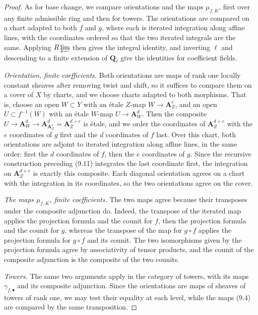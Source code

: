 \documentclass[11pt]{article}
\begin{document}
\begin{proof}[{Proof}]\label{bp82}%
As for base change, we compare orientations and the maps \(\mu_{f,K}\), first over any finite admissible ring and then for towers. The orientations are compared on a chart adapted to both \(f\) and \(g\), where each is iterated integration along affine lines, with the coordinates ordered so that the two iterated integrals are the same. Applying \(R\varprojlim\) then gives the integral identity, and inverting \(\ell\) and descending to a finite extension of \(\mathbf Q_\ell\) give the identities for coefficient fields.

\emph{Orientation, finite coefficients.} Both orientations are maps of rank one locally constant sheaves after removing twist and shift, so it suffices to compare them on a cover of \(X\) by charts, and we choose charts adapted to both morphisms. That is, choose an open \(W\subset Y\) with an étale \(Z\)-map \(W\to\mathbf A^e_Z\), and an open \(U\subset f^{-1}(W)\) with an étale \(W\)-map \(U\to\mathbf A^d_W\). Then the composite \(U\to\mathbf A^d_W\to\mathbf A^d_{\mathbf A^e_Z}=\mathbf A^{d+e}_Z\) is étale, and we order the coordinates of \(\mathbf A^{d+e}_Z\) with the \(e\) coordinates of \(g\) first and the \(d\) coordinates of \(f\) last. Over this chart, both orientations are adjoint to iterated integration along affine lines, in the same order: first the \(d\) coordinates of \(f\), then the \(e\) coordinates of \(g\). Since the recursive construction preceding (9.11) integrates the last coordinate first, the integration on \(\mathbf A^{d+e}_Z\) is exactly this composite. Each diagonal orientation agrees on a chart with the integration in its coordinates, so the two orientations agree on the cover.

\emph{The maps \(\mu_{f,K}\), finite coefficients.} The two maps agree because their transposes under the composite adjunction do. Indeed, the transpose of the iterated map applies the projection formula and the counit for \(f\), then the projection formula and the counit for \(g\), whereas the transpose of the map for \(g\circ f\) applies the projection formula for \(g\circ f\) and its counit. The two isomorphisms given by the projection formula agree by associativity of tensor products, and the counit of the composite adjunction is the composite of the two counits.

\emph{Towers.} The same two arguments apply in the category of towers, with its maps \(\gamma_{f,\bullet}\) and its composite adjunction. Since the orientations are maps of sheaves of towers of rank one, we may test their equality at each level, while the maps (9.4) are compared by the same transposition.
\end{proof}
\end{document}
